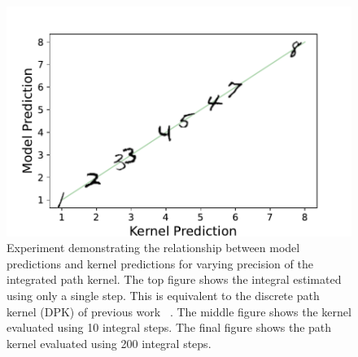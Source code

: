 \begin{figure}[!h]
    \includegraphics[width=0.95\linewidth]{c4_figures/mnist_model_kernel_compare_200_steps.pdf}
    \caption{Experiment demonstrating the relationship between model predictions and kernel predictions for varying precision of the integrated path kernel. The top figure shows the integral estimated using only a single step. This is equivalent to the discrete path kernel (DPK) of previous work ~\citep{domingos2020every, chen2021equivalence}. The middle figure shows the kernel evaluated using 10 integral steps. The final figure shows the path kernel evaluated using 200 integral steps.}
    \label{fig:mnist}
\end{figure}
